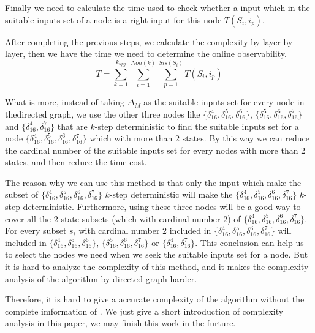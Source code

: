 Finally we need to calculate the time used to check whether a input which in the suitable inputs set of a node is a right input for this node $T(S_i, i_p)$.

After completing the previous steps, we calculate the complexity by layer by layer, then we have the time we need to determine the online observability.  
\[T=\sum_{k=1}^{k_{upg}}\sum_{i=1}^{Non(k)}\sum_{p=1}^{Sis(S_i)}T(S_i, i_p)\]

What is more, instead of taking $\Delta_M$ as the suitable inputs set for every node in thedirected graph, we use the other three nodes like $\{\delta_{16}^4,\delta_{16}^5,\delta_{16}^6\}$, $\{\delta_{16}^5,\delta_{16}^6,\delta_{16}^7\}$ and $\{\delta_{16}^4,\delta_{16}^7\}$ that are $k$-step deterministic to find the suitable inputs set for a node $\{\delta_{16}^4,\delta_{16}^5,\delta_{16}^6,\delta_{16}^7\}$ which with more than $2$ states. By this way we can  reduce the cardinal number of the suitable inputs set for every nodes with more than 2 states, and then reduce the time cost. 

The reason why we can use this method is that only the input which make the subset of $\{\delta_{16}^4,\delta_{16}^5,\delta_{16}^6,\delta_{16}^7\}$ $k$-step deterministic will make the $\{\delta_{16}^4,\delta_{16}^5,\delta_{16}^6,\delta_{16}^7\}$ $k$-step deterministic. Furthermore, using these three nodes will be a good way to cover all the 2-state subsets (which with cardinal number $2$) of $\{\delta_{16}^4,\delta_{16}^5,\delta_{16}^6,\delta_{16}^7\}$. For every subset $s_i$ with cardinal number $2$ included in $\{\delta_{16}^4,\delta_{16}^5,\delta_{16}^6,\delta_{16}^7\}$ will included in $\{\delta_{16}^4,\delta_{16}^5,\delta_{16}^6\}$, $\{\delta_{16}^5,\delta_{16}^6,\delta_{16}^7\}$ or $\{\delta_{16}^4,\delta_{16}^7\}$. This conclusion can help us to select the nodes we need when we seek the suitable inputs set for a node. But it is hard to analyze the complexity of this method, and it makes the complexity analysis of the algorithm by directed graph harder.

Therefore, it is hard to give a accurate complexity of the algorithm without the complete imformation of \BCNs. We just give a short introduction of complexity analysis in this paper, we may finish this work in the furture.
